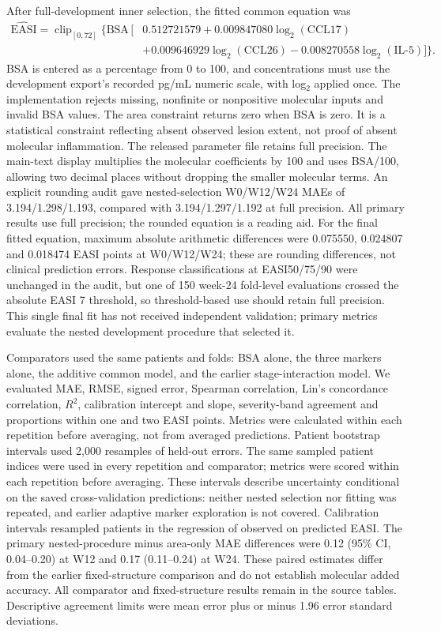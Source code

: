 \documentclass[10pt,a4paper]{article}
\begin{document}
After full-development inner selection, the fitted common equation was
\begin{align*}
\widehat{\mathrm{EASI}}=\operatorname{clip}_{[0,72]}\{\mathrm{BSA}\,[&0.512721579
 +0.009847080\log_2(\mathrm{CCL17})\\
 &+0.009646929\log_2(\mathrm{CCL26})
 -0.008270558\log_2(\mathrm{IL\mbox{-}5})]\}.
\end{align*}
BSA is entered as a percentage from 0 to 100, and concentrations must use the development export's recorded pg/mL numeric scale, with log$_2$ applied once. The implementation rejects missing, nonfinite or nonpositive molecular inputs and invalid BSA values. The area constraint returns zero when BSA is zero. It is a statistical constraint reflecting absent observed lesion extent, not proof of absent molecular inflammation. The released parameter file retains full precision. The main-text display multiplies the molecular coefficients by 100 and uses BSA/100, allowing two decimal places without dropping the smaller molecular terms. An explicit rounding audit gave nested-selection W0/W12/W24 MAEs of 3.194/1.298/1.193, compared with 3.194/1.297/1.192 at full precision. All primary results use full precision; the rounded equation is a reading aid. For the final fitted equation, maximum absolute arithmetic differences were 0.075550, 0.024807 and 0.018474 EASI points at W0/W12/W24; these are rounding differences, not clinical prediction errors. Response classifications at EASI50/75/90 were unchanged in the audit, but one of 150 week-24 fold-level evaluations crossed the absolute EASI 7 threshold, so threshold-based use should retain full precision. This single final fit has not received independent validation; primary metrics evaluate the nested development procedure that selected it.

Comparators used the same patients and folds: BSA alone, the three markers alone, the additive common model, and the earlier stage-interaction model. We evaluated MAE, RMSE, signed error, Spearman correlation, Lin's concordance correlation, $R^2$, calibration intercept and slope, severity-band agreement and proportions within one and two EASI points. Metrics were calculated within each repetition before averaging, not from averaged predictions. Patient bootstrap intervals used 2,000 resamples of held-out errors. The same sampled patient indices were used in every repetition and comparator; metrics were scored within each repetition before averaging. These intervals describe uncertainty conditional on the saved cross-validation predictions: neither nested selection nor fitting was repeated, and earlier adaptive marker exploration is not covered. Calibration intervals resampled patients in the regression of observed on predicted EASI. The primary nested-procedure minus area-only MAE differences were 0.12 (95\% CI, 0.04--0.20) at W12 and 0.17 (0.11--0.24) at W24. These paired estimates differ from the earlier fixed-structure comparison and do not establish molecular added accuracy. All comparator and fixed-structure results remain in the source tables. Descriptive agreement limits were mean error plus or minus 1.96 error standard deviations.\citep{bland2007}
\end{document}
